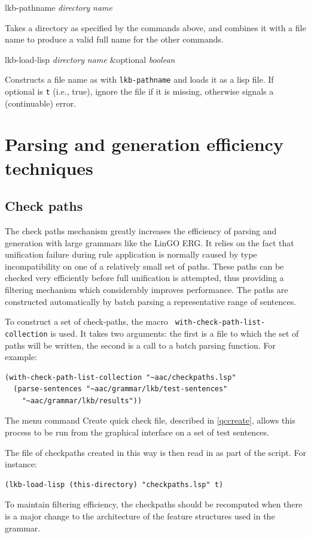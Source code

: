 \documentclass[12pt]{report}
\newcommand{\lispcommand}[1]{\noindent\rm #1}%
\newcommand{\functionname}[1]{{\tt #1}}
\newcommand{\lkbmenucommand}{{\bf}}
\begin{document}
\lispcommand{lkb-pathname {\it directory} {\it name}}

Takes a directory as specified by the commands above, and combines it
with a file name to produce a valid full name for the other commands.

\lispcommand{lkb-load-lisp {\it directory} {\it name} 
\&optional {\it boolean}}

Constructs a file name as with \functionname{lkb-pathname} and loads it
as a lisp file.  If optional is {\tt t} (i.e., true),
ignore the file if it is missing, otherwise signals a (continuable) error.

\section{Parsing and generation efficiency techniques}

\subsection{Check paths}
\label{checkpaths}

The check paths mechanism greatly increases the efficiency of
parsing and generation with large grammars like the LinGO ERG.
It relies on the fact that unification failure during rule application
is normally caused by type incompatibility on one of a relatively
small set of paths.  These paths can be checked very efficiently 
before full unification is attempted, thus providing a filtering
mechanism which considerably improves performance.  The paths
are constructed automatically by batch parsing a representative
range of sentences.

To construct a set of check-paths, the macro {\tt
with-check-path-list-collection} is used.  It takes two arguments: the first is
a file to which the set of paths will be written, the second
is a call to a batch parsing function.  For example:
\begin{verbatim}
(with-check-path-list-collection "~aac/checkpaths.lsp"
  (parse-sentences "~aac/grammar/lkb/test-sentences" 
    "~aac/grammar/lkb/results"))
\end{verbatim}
The menu command {\lkbmenucommand Create quick check file},
described in \ref{qccreate}, allows this process to be
run from the graphical interface on a set of test sentences.

The file of checkpaths created in this way
is then read in as part of the script.
For instance:
\begin{verbatim}
(lkb-load-lisp (this-directory) "checkpaths.lsp" t)
\end{verbatim}
To maintain filtering efficiency, the checkpaths should be
recomputed when there is a major change to the 
architecture of the feature structures used in the grammar.
\end{document}
